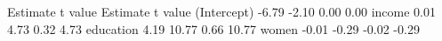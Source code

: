 \begin{Schunk}
\begin{Soutput}
            Estimate t value Estimate t value
(Intercept)    -6.79   -2.10     0.00    0.00
income          0.01    4.73     0.32    4.73
education       4.19   10.77     0.66   10.77
women          -0.01   -0.29    -0.02   -0.29
\end{Soutput}
\end{Schunk}
